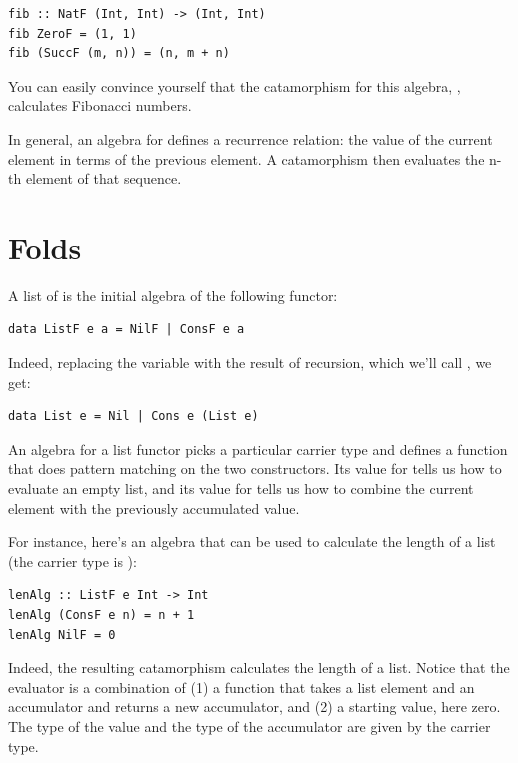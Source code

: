 \begin{Verbatim}[commandchars=\\\{\}]
fib :: NatF (Int, Int) -> (Int, Int)
fib ZeroF = (1, 1)
fib (SuccF (m, n)) = (n, m + n)
\end{Verbatim}
You can easily convince yourself that the catamorphism for this algebra,
, calculates Fibonacci numbers.

In general, an algebra for  defines a recurrence relation:
the value of the current element in terms of the previous element. A
catamorphism then evaluates the n-th element of that sequence.

\section{Folds}\label{folds}

A list of  is the initial algebra of the following functor:

\begin{Verbatim}[commandchars=\\\{\}]
data ListF e a = NilF | ConsF e a
\end{Verbatim}
Indeed, replacing the variable  with the result of recursion,
which we'll call , we get:

\begin{Verbatim}[commandchars=\\\{\}]
data List e = Nil | Cons e (List e)
\end{Verbatim}
An algebra for a list functor picks a particular carrier type and
defines a function that does pattern matching on the two constructors.
Its value for  tells us how to evaluate an empty list, and
its value for  tells us how to combine the current element
with the previously accumulated value.

For instance, here's an algebra that can be used to calculate the length
of a list (the carrier type is ):

\begin{Verbatim}[commandchars=\\\{\}]
lenAlg :: ListF e Int -> Int
lenAlg (ConsF e n) = n + 1
lenAlg NilF = 0
\end{Verbatim}
Indeed, the resulting catamorphism  calculates the
length of a list. Notice that the evaluator is a combination of (1) a
function that takes a list element and an accumulator and returns a new
accumulator, and (2) a starting value, here zero. The type of the value
and the type of the accumulator are given by the carrier type.

